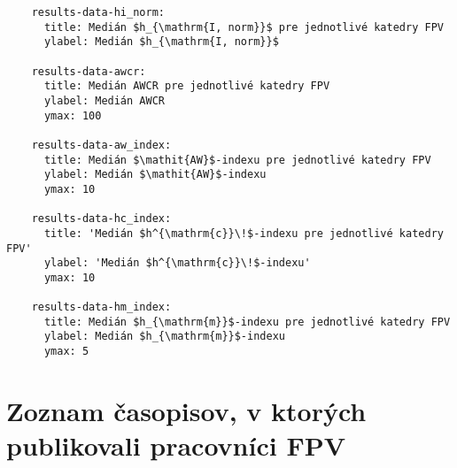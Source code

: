 \begin{source}
\begin{verbatim}
    results-data-hi_norm:
      title: Medián $h_{\mathrm{I, norm}}$ pre jednotlivé katedry FPV
      ylabel: Medián $h_{\mathrm{I, norm}}$

    results-data-awcr:
      title: Medián AWCR pre jednotlivé katedry FPV
      ylabel: Medián AWCR
      ymax: 100

    results-data-aw_index:
      title: Medián $\mathit{AW}$-indexu pre jednotlivé katedry FPV
      ylabel: Medián $\mathit{AW}$-indexu
      ymax: 10

    results-data-hc_index:
      title: 'Medián $h^{\mathrm{c}}\!$-indexu pre jednotlivé katedry FPV'
      ylabel: 'Medián $h^{\mathrm{c}}\!$-indexu'
      ymax: 10

    results-data-hm_index:
      title: Medián $h_{\mathrm{m}}$-indexu pre jednotlivé katedry FPV
      ylabel: Medián $h_{\mathrm{m}}$-indexu
      ymax: 5
  \end{verbatim}
\end{source}

\section*{Zoznam časopisov, v ktorých publikovali pracovníci FPV}
\vspace{-0.5em}

